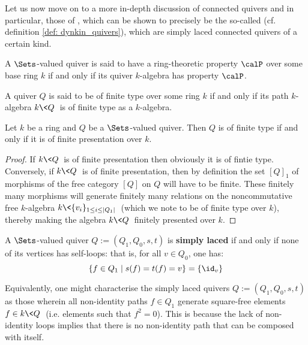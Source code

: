            Let us now move on to a more in-depth discussion of connected quivers and in particular, those of , which can be shown to precisely be the so-called  (cf. definition \ref{def: dynkin_quivers}), which are simply laced connected quivers of a certain kind. 
            \begin{definition}
                A $\Sets$-valued quiver is said to have a ring-theoretic property $\calP$ over some base ring $k$ if and only if its quiver $k$-algebra has property $\calP$. 
            \end{definition}
            \begin{example}
                A quiver $Q$ is said to be of finite type over some ring $k$ if and only if its path $k$-algebra $k\<Q\>$ is of finite type as a $k$-algebra.
            \end{example}
            \begin{proposition} \label{prop: quivers_of_finite_type_are_of_finite_presentations}
                Let $k$ be a ring and $Q$ be a $\Sets$-valued quiver. Then $Q$ is of finite type if and only if it is of finite presentation over $k$.
            \end{proposition}
                \begin{proof}
                    If $k\<Q\>$ is of finite presentation then obviously it is of fintie type. Conversely, if $k\<Q\>$ is of finite presentation, then by definition the set $[Q]_1$ of morphisms of the free category $[Q]$ on $Q$ will have to be finite. These finitely many morphisms will generate finitely many relations on the noncommutative free $k$-algebra $k\<\{v_i\}_{1 \leq i \leq |Q_1|}\>$ (which we note to be of finite type over $k$), thereby making the algebra $k\<Q\>$ finitely presented over $k$.
                \end{proof}
            \begin{definition} \label{def: simply_laced_quivers}
                A $\Sets$-valued quiver $Q := (Q_1, Q_0, s, t)$ is \textbf{simply laced} if and only if none of its vertices has self-loops: that is, for all $v \in Q_0$, one has:
                    $$\{f \in Q_1 \mid s(f) = t(f) = v\} = \{\id_v\}$$
            \end{definition}
            \begin{remark}
                Equivalently, one might characterise the simply laced quivers $Q := (Q_1, Q_0, s, t)$ as those wherein all non-identity paths $f \in Q_1$ generate square-free elements $f \in k\<Q\>$ (i.e. elements such that $f^2 = 0$). This is because the lack of non-identity loops implies that there is no non-identity path that can be composed with itself. 
            \end{remark}
